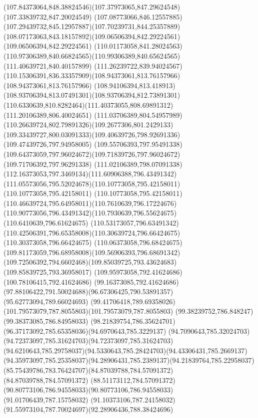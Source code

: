 {{	\curveto(107.84373064,848.38824546)(107.37973065,847.29624548)(107.33839732,847.20024549)
	\curveto(107.08773066,846.12557885)(107.29439732,845.12957887)(107.70239731,844.25357889)
	\curveto(108.07173063,843.18157892)(109.06506394,842.29224561)(109.06506394,842.29224561)
	\curveto(110.01173058,841.28024563)(110.97306389,840.66824565)(110.99306389,840.65624565)
	\lineto(111.40639721,840.40157899)
	\lineto(111.26239722,839.94024567)
	\curveto(110.15306391,836.33357909)(108.94373061,813.76157966)(108.94373061,813.76157966)
	\curveto(108.94106394,813.418913)(108.93706394,813.07491301)(108.93706394,812.73891301)
	\curveto(110.6330639,810.8282464)(111.40373055,808.69891312)(111.20106389,806.40024651)
	\curveto(111.03706389,804.54957989)(110.26639724,802.79891326)(109.2677306,801.2429133)
	\curveto(109.33439727,800.03091333)(109.40639726,798.92691336)(109.47439726,797.94958005)
	\curveto(109.55706393,797.95491338)(109.64373059,797.96024672)(109.71839726,797.96024672)
	\lineto(109.71706392,797.96291338)
	\curveto(111.02106389,798.07091338)(112.16373053,797.3469134)(111.60906388,796.43491342)
	\curveto(111.05573056,795.52024678)(110.10773058,795.42158011)(110.10773058,795.42158011)
	\curveto(110.10773058,795.42158011)(110.46639724,795.64958011)(110.7610639,796.17224676)
	\curveto(110.90773056,796.43491342)(110.7930639,796.55624675)(110.6410639,796.61624675)
	\curveto(110.53173057,796.63491342)(110.42506391,796.65358008)(110.30639724,796.66424675)
	\lineto(110.30373058,796.66424675)
	\curveto(110.06373058,796.68424675)(109.81173059,796.68958008)(109.56906393,796.68691342)
	\curveto(109.72506392,794.6602468)(109.85039725,793.43624683)(109.85839725,793.36958017)
	\lineto(109.95973058,792.41624686)
	\lineto(100.78106415,792.41624686)
	\lineto(99.16373085,792.41624686)
	\curveto(97.88106422,791.50024688)(96.67306425,790.53891357)(95.62773094,789.66024693)
	\curveto(99.41706418,789.69358026)(101.79573079,787.8055803)(101.79573079,787.8055803)
	\lineto(99.38239752,786.848247)
	\lineto(99.38373085,786.84958033)
	\curveto(98.21839754,786.35624701)(96.37173092,785.65358036)(94.6970643,785.3229137)
	\curveto(94.7090643,785.32024703)(94.72373097,785.31624703)(94.72373097,785.31624703)
	\curveto(94.6210643,785.29758037)(94.5330643,785.28424703)(94.43306431,785.2669137)
	\curveto(94.35973097,785.25358037)(94.28906431,785.2389137)(94.21839764,785.22958037)
	\curveto(85.75439786,783.76424707)(84.87039788,784.57091372)(84.87039788,784.57091372)
	\curveto(88.51173112,784.57091372)(90.80773106,786.94558033)(90.80773106,786.94558033)
	\lineto(91.01706439,787.15758032)
	\curveto(91.10373106,787.24158032)(91.55973104,787.70024697)(92.28906436,788.38424696)
}}
